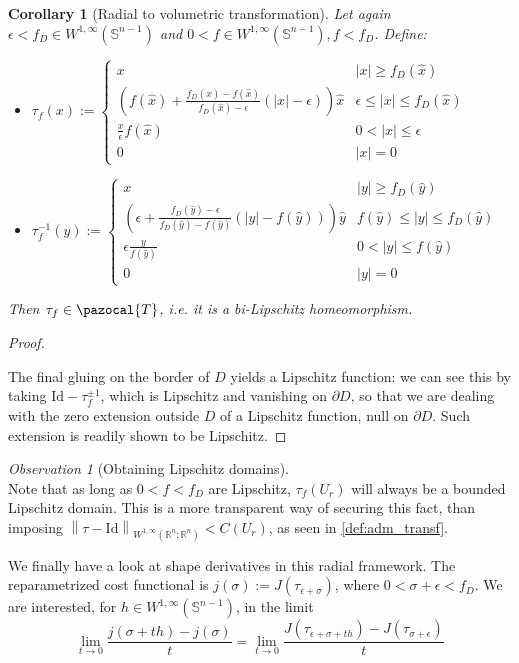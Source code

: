 \documentclass[english,a4paper,10pt,oneside]{scrbook}	%
\theoremstyle{break}
\newtheorem{cor}[equation]{Corollary}
\newenvironment{mproof}[1][\proofname]{%
  \begin{proof}[#1]$ $\par\nobreak\ignorespaces
}{%
  \end{proof}
}
\renewcommand*{\proofname}{Proof}
\theoremstyle{remark}
\newtheorem{obs}[equation]{Observation}
\newcommand{\mR}{\mathbb{R}}
\newcommand{\mS}{\mathbb{S}^{n-1}}
\newcommand{\ds}{\displaystyle}
\newcommand{\norm}[1]{\left\lVert#1\right\rVert}
\newcommand{\cT}{\pazocal{T}}
\newcommand{\id}{\text{Id}}
\newcommand{\xh}{\hat{x}}
\newcommand{\yh}{\hat{y}}
\newcommand{\eps}{\epsilon}
\begin{document}
\begin{cor}[Radial to volumetric transformation]
\label{cor:star_shaped_transformation}
Let again $\eps <f_D \in W^{1,\infty}(\mS)$ and $0<f \in W^{1,\infty}(\mS), f<f_D$. Define:

\begin{itemize}
	\item $\ds \tau_f(x):=\left\{\begin{matrix}
 x & |x|\geq f_D(\xh)\\ 
 \left (  f(\xh)+\frac{f_D(\xh)-f(\xh)}{f_D(\xh)-\eps}(|x|-\eps) \right )\xh & \eps \leq |x| \leq f_D(\xh) \\ 
 \frac{x}{\epsilon}f(\hat{x}) & 0<|x|\leq \eps\\ 
 0 & |x|=0
\end{matrix}\right.$

	\item $\ds \tau_f^{-1}(y):=\left\{\begin{matrix}
 x & |y|\geq f_D(\yh)\\ 
 \left (  \eps+\frac{f_D(\yh)-\eps}{f_D(\yh)-f(\yh)}(|y|-f(\yh)) \right )\yh & f(\yh) \leq |y| \leq f_D(\yh) \\ 
 \epsilon \frac{y}{f(\hat{y})}& 0<|y|\leq f(\yh)\\ 
 0 & |y|=0
\end{matrix}\right.$
\end{itemize}


Then $\tau_f \in \cT$, i.e. it is a bi-Lipschitz homeomorphism.
\end{cor}
\begin{mproof}

The final gluing on the border of $D$ yields a Lipschitz function: we can see this by taking $\id -\tau_f^{\pm 1}$, which is Lipschitz and vanishing on $\partial D$, so that we are dealing with the zero extension outside $D$ of a Lipschitz function, null on $\partial D$. Such extension is readily shown to be Lipschitz.
\end{mproof}

\begin{obs}[Obtaining Lipschitz domains]
\mbox{} \\
Note that as long as $0<f<f_D$ are Lipschitz, $\tau_f(U_r)$ will always be a bounded Lipschitz domain. This is a more transparent way of securing this fact, than imposing $\norm{\tau-\id}_{W^{1,\infty}(\mR^n;\mR^n)}< C(U_r)$, as seen in \cref{def:adm_transf}.
\end{obs}

We finally have a look at shape derivatives in this radial framework. The reparametrized cost functional is $j(\sigma):=J(\tau_{\eps+\sigma})$, where $0<\sigma+\eps < f_D$. We are interested, for $h\in W^{1, \infty}(\mS)$, in the limit $$\lim_{t\rightarrow 0}\frac{j(\sigma+th)-j(\sigma)}{t}=\lim_{t\rightarrow 0}\frac{J(\tau_{\eps+\sigma+th})-J(\tau_{\sigma+\eps})}{t}$$
\end{document}
